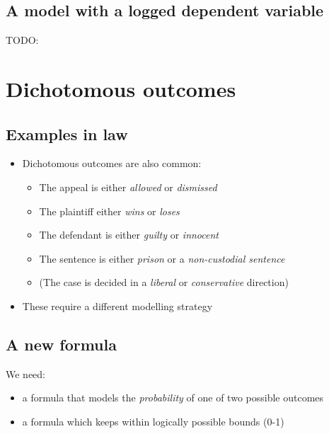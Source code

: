 \documentclass[12pt,twoside]{article}
\providecommand{\tightlist}{%
  \setlength{\itemsep}{0pt}\setlength{\parskip}{0pt}}
\begin{document}
\subsection{A model with a logged dependent
variable}\label{a-model-with-a-logged-dependent-variable}

TODO:

\section{Dichotomous outcomes}\label{dichotomous-outcomes}

\subsection{Examples in law}\label{examples-in-law}

\begin{itemize}
\tightlist
\item
  Dichotomous outcomes are also common:

  \begin{itemize}
  \tightlist
  \item
    The appeal is either \emph{allowed} or \emph{dismissed}
  \item
    The plaintiff either \emph{wins} or \emph{loses}
  \item
    The defendant is either \emph{guilty} or \emph{innocent}
  \item
    The sentence is either \emph{prison} or a \emph{non-custodial
    sentence}
  \item
    (The case is decided in a \emph{liberal} or \emph{conservative}
    direction)
  \end{itemize}
\item
  These require a different modelling strategy
\end{itemize}

\subsection{A new formula}\label{a-new-formula}

We need:

\begin{itemize}
\tightlist
\item
  a formula that models the \emph{probability} of one of two possible
  outcomes
\item
  a formula which keeps within logically possible bounds (0-1)
\end{itemize}
\end{document}
